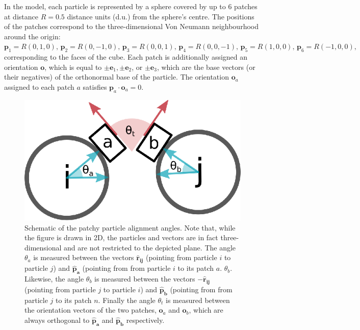 In the model, each particle is represented by a sphere covered by up to 6 patches at distance $R = 0.5$ distance units (d.u.) from the sphere's centre. The positions of the patches correspond to the three-dimensional Von Neumann neighbourhood around the origin:
$
 \mathbf{p}_1 = R \left( 0,1,0\right),\, \mathbf{p}_2 = R \left( 0,-1,0 \right),\,   %
 \mathbf{p}_3 = R \left( 0,0,1 \right),\, \mathbf{p}_4 = R \left(  0, 0, -1 \right),\, %
 \mathbf{p}_5 = R \left( 1,0,0 \right),\, \mathbf{p}_6 = R \left( -1, 0, 0 \right),
$
corresponding to the faces of the cube. Each patch is additionally assigned an orientation $\mathbf{o}$, which is equal to
$\pm \mathbf{e}_1, \pm \mathbf{e}_2$, or $\pm \mathbf{e}_3$, which are the base vectors (or their negatives) of the orthonormal base of the particle. The orientation  $\mathbf{o}_a$ assigned to each patch $a$ satisfies $\mathbf{p}_a \cdot \mathbf{o}_a = 0$.

\begin{figure}[h]
\centering
\includegraphics[width=0.8\linewidth]{figures/pp.eps}
\caption{Schematic of the patchy particle alignment angles. Note that, while the figure is drawn in 2D, the particles and vectors are in fact three-dimensional and are not restricted to the depicted plane. The angle \(\theta_a\) is measured between the vectors \(\mathbf{\hat{r}_{ij}}\) (pointing from particle \(i\) to particle \(j\)) and \(\mathbf{\hat{p}_a}\) (pointing from from particle \(i\) to its patch \(a\).  \(\theta_b\). Likewise, the angle \(\theta_b\) is measured between the vectors \(-\mathbf{\hat{r}_{ij}}\) (pointing from particle \(j\) to particle \(i\)) and \(\mathbf{\hat{p}_b}\) (pointing from from particle \(j\) to its patch \(n\). Finally the angle \(\theta_t\) is measured between the orientation vectors of the two patches, \(\mathbf{o}_{a}\) and \(\mathbf{o}_{b}\), which are always orthogonal to \(\mathbf{\hat{p}_a}\) and \(\mathbf{\hat{p}_b}\) respectively.
}
\label{fig:pp}
\end{figure}

